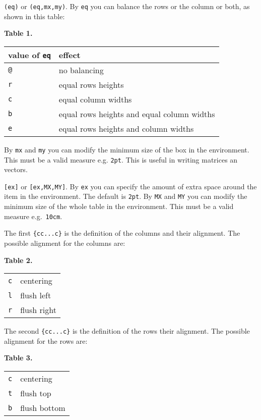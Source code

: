 \documentclass[a4paper,final,11pt]{article}
\begin{document}
\begin{dotlist}
  \item
  \verb|(eq)| or \verb|(eq,mx,my)|.  By \verb|eq| you can balance
  the rows or the column or both, as shown in this table:
  \begin{center}
    \textbf{Table 1.}\nobreak\\[1em]
    \begin{tabular}{|l|l|}
      \hline
      value of \verb|eq| & effect \\
      \hline
      \verb'@' & no balancing \\
      \verb'r' & equal rows heights \\
      \verb'c' & equal column widths  \\
      \verb'b' & equal rows heights and equal column widths \\
      \verb'e' & equal rows heights and column widths \\
      \hline
    \end{tabular}
  \end{center}
  By \verb|mx| and \verb|my| you can modify the minimum size of the
  box in the  environment.
  This must be a valid measure e.g. \verb|2pt|. 
  This is useful in writing matrices an vectors.
  \item
  \verb|[ex]| or \verb|[ex,MX,MY]|.  By \verb|ex| you can specify
  the amount of extra space around the item in the 
  environment.  The default is \verb|2pt|.  By \verb|MX| and \verb|MY|
  you can modify the minimum size of the whole table in the 
   environment.  This must be a valid measure
  e.g.~\verb|10cm|.
  \item
  The first \verb|{cc...c}| is the definition of the columns and
  their alignment.  The possible alignment for the columns are:
  \begin{center}
    \textbf{Table 2.} \nobreak\\[1em]
    \begin{tabular}{|l|l|}
      \hline
      \verb'c' & centering \\
      \verb'l' & flush left \\
      \verb'r' & flush right \\
      \hline
    \end{tabular}
  \end{center}
  \item
  The second \verb|{cc...c}| is the definition of the rows their
  alignment.  The possible alignment for the rows are:
  \begin{center}
    \textbf{Table 3.} \\[1em]
    \begin{tabular}{|l|l|}
      \hline
      \verb'c' & centering \\
      \verb't' & flush top \\
      \verb'b' & flush bottom \\
      \hline
    \end{tabular}
  \end{center}
\end{dotlist}
\end{document}

